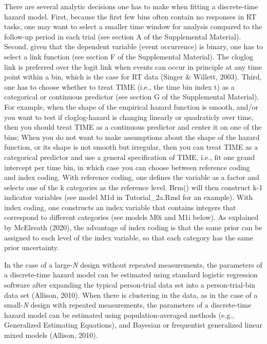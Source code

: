 \documentclass[
  english,
  man, donotrepeattitle,floatsintext]{apa6}
\begin{document}
There are several analytic decisions one has to make when fitting a discrete-time hazard model. First, because the first few bins often contain no responses in RT tasks, one may want to select a smaller time window for analysis compared to the follow-up period in each trial (see section A of the Supplemental Material). Second, given that the dependent variable (event occurrence) is binary, one has to select a link function (see section F of the Supplemental Material). The cloglog link is preferred over the logit link when events can occur in principle at any time point within a bin, which is the case for RT data (Singer \& Willett, 2003). Third, one has to choose whether to treat TIME (i.e., the time bin index t) as a categorical or continuous predictor (see section G of the Supplemental Material). For example, when the shape of the empirical hazard function is smooth, and/or you want to test if cloglog-hazard is changing linearly or quadraticly over time, then you should treat TIME as a continuous predictor and center it on one of the bins; When you do not want to make assumptions about the shape of the hazard function, or its shape is not smooth but irregular, then you can treat TIME as a categorical predictor and use a general specification of TIME, i.e., fit one grand intercept per time bin, in which case you can choose between reference coding and index coding. With reference coding, one defines the variable as a factor and selects one of the k categories as the reference level. Brm() will then construct k-1 indicator variables (see model M1d in Tutorial\_2a.Rmd for an example). With index coding, one constructs an index variable that contains integers that correspond to different categories (see models M0i and M1i below). As explained by McElreath (2020), the advantage of index coding is that the same prior can be assigned to each level of the index variable, so that each category has the same prior uncertainty.

In the case of a large-\emph{N} design without repeated measurements, the parameters of a discrete-time hazard model can be estimated using standard logistic regression software after expanding the typical person-trial data set into a person-trial-bin data set (Allison, 2010). When there is clustering in the data, as in the case of a small-\emph{N} design with repeated measurements, the parameters of a discrete-time hazard model can be estimated using population-averaged methods (e.g., Generalized Estimating Equations), and Bayesian or frequentist generalized linear mixed models (Allison, 2010).
\end{document}

